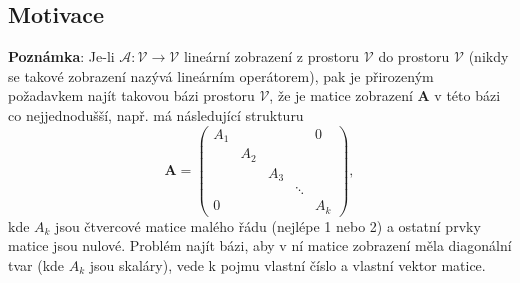     \subsection{Motivace} 
      \textbf{Poznámka}: Je-li $\mathcal{A} : \mathcal{V} \rightarrow \mathcal{V}$ lineární zobrazení z 
      prostoru $\mathcal{V}$ do prostoru $\mathcal{V}$ (nikdy se takové zobrazení nazývá lineárním       
      operátorem), pak je přirozeným požadavkem najít takovou bázi prostoru $\mathcal{V}$, že je matice 
      zobrazení $\mathbf{A}$ v této bázi co nejjednodušší, např. má následující strukturu
       \begin{equation*}
          \mathbf{A}=
            \left(\begin{array}{ccccc}
              \boxed{A_1}       &             &       &       & 0   \\
                  & \boxed{A_2} &             &       &             \\
                  &             & \boxed{A_3} &       &             \\
                  &             &             &\ddots &             \\
               0  &             &             &       & \boxed{A_k}
             \end{array}
            \right),
       \end{equation*}
      kde $A_k$ jsou čtvercové matice malého řádu (nejlépe 1 nebo 2) a ostatní prvky matice jsou nulové. 
      Problém najít bázi, aby v ní matice zobrazení měla diagonální tvar (kde $A_k$ jsou skaláry), vede k 
      pojmu vlastní číslo a vlastní vektor matice.
